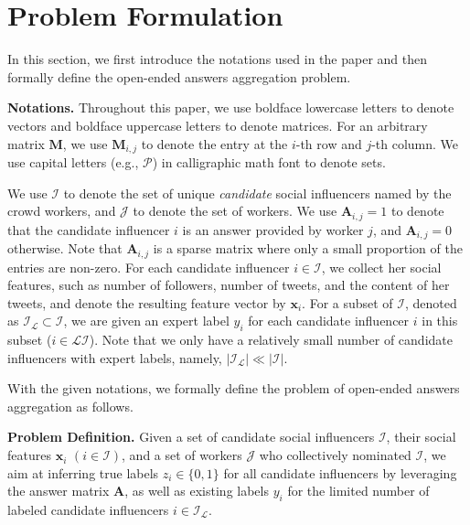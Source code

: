 \section{Problem Formulation}

In this section, we first introduce the notations used in the paper and then formally define the open-ended answers aggregation problem.

\smallskip
\noindent\textbf{Notations.} Throughout this paper, we use boldface lowercase letters to denote vectors and boldface uppercase letters to denote matrices. For an arbitrary matrix $\mathbf{M}$, we use $\mathbf{M}_{i,j}$ to denote the entry at the $i$-th row and $j$-th column. We use capital letters (e.g., $\mathcal{P}$) in calligraphic math font to denote sets.

We use $\mathcal{I}$ to denote the set of unique \emph{candidate} social influencers named by the crowd workers, and $\mathcal{J}$ to denote the set of workers. We use $\mathbf{A}_{i,j}=1$ to denote that the candidate influencer $i$ is an answer provided by worker $j$, and $\mathbf{A}_{i,j}=0$ otherwise. Note that $\mathbf{A}_{i,j}$ is a sparse matrix where only a small proportion of the entries are non-zero. 
For each candidate influencer $i \in \mathcal{I}$, we collect her social features, such as number of followers, number of tweets, and the content of her tweets, and denote the resulting feature vector by $\mathbf{x}_i$. For a subset of $\mathcal{I}$, denoted as $\mathcal{I_L} \subset \mathcal{I}$, we are given an expert label $y_i$ for each candidate influencer $i$ in this subset ($i\in \mathcal{LI}$). Note that we only have a relatively small number of candidate influencers with expert labels, namely, $|\mathcal{I_L}| \ll |\mathcal{I}|$. %



With the given notations, we formally define the problem of open-ended answers aggregation as follows.

\smallskip
\noindent\textbf{Problem Definition.} Given a set of candidate social influencers $\mathcal{I}$, their social features $\mathbf{x}_i$ $(i \in \mathcal{I})$, and a set of workers $\mathcal{J}$ who collectively nominated $\mathcal{I}$, we aim at inferring true labels $z_i \in \{0,1\}$ for all candidate influencers by leveraging the answer matrix $\mathbf{A}$, as well as existing labels $y_i$ for the limited number of labeled candidate influencers $i\in \mathcal{I_L}$. 